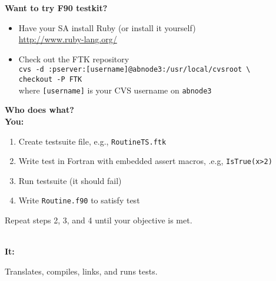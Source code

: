 \documentclass[landscape]{slides}
\begin{document}
\begin{slide}
  \begin{center}
    {\bf\Large Want to try F90 testkit?}\\
    \vspace{0.5in}
    \begin{minipage}{9in}
     \begin{itemize}
      \item Have your SA install Ruby {\small(or install it yourself)}\\[5pt]
       \hspace*{1em}\url{http://www.ruby-lang.org/}\\[5pt]
      \item Check out the FTK repository\\[5pt]
       \hspace*{1em}\verb+cvs -d :pserver:[username]@abnode3:/usr/local/cvsroot \+\\
       \hspace*{1em}\verb+checkout -P FTK+\\[5pt]
       where \verb+[username]+ is your CVS username on \verb+abnode3+
     \end{itemize}
    \end{minipage}
  \end{center}
\end{slide}
\begin{slide}
  \begin{center}
    {\bf\Large Who does what?}\\
    \vspace{0.5in}
    {\bf You:}
    \begin{minipage}[t]{6.5in}\raggedright
     \begin{enumerate}
      \item Create testsuite file, e.g., \verb+RoutineTS.ftk+
      \item Write test in Fortran with embedded assert macros, .e.g,
        \verb+IsTrue(x>2)+
      \item Run testsuite {\small (it should fail)}
      \item Write \verb+Routine.f90+ to satisfy test
     \end{enumerate}
     \vspace{10pt}
     Repeat steps 2, 3, and 4 until your objective is met.
    \end{minipage}\\
    \vspace{0.8in}
   {\bf It:}
   \begin{minipage}[t]{6in}\raggedright
   Translates, compiles, links, and runs tests.
   \end{minipage}
  \end{center}
\end{slide}
\end{document}
